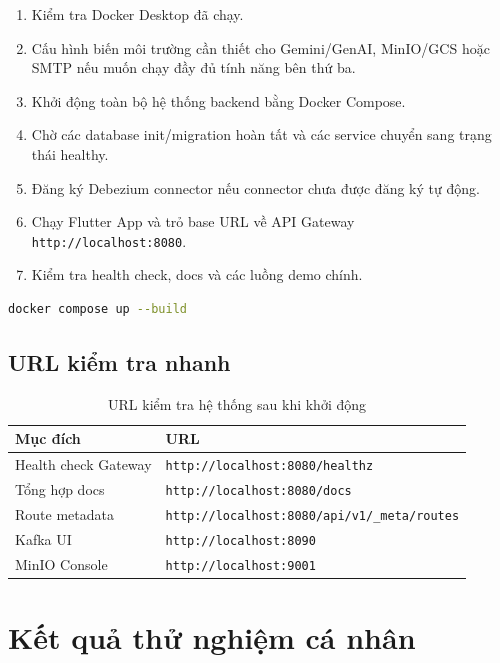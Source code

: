 \documentclass[14pt,a4paper,oneside]{extreport}
\begin{document}
\begin{enumerate}[leftmargin=2cm]
  \item Kiểm tra Docker Desktop đã chạy.
  \item Cấu hình biến môi trường cần thiết cho Gemini/GenAI, MinIO/GCS hoặc SMTP nếu muốn chạy đầy đủ tính năng bên thứ ba.
  \item Khởi động toàn bộ hệ thống backend bằng Docker Compose.
  \item Chờ các database init/migration hoàn tất và các service chuyển sang trạng thái healthy.
  \item Đăng ký Debezium connector nếu connector chưa được đăng ký tự động.
  \item Chạy Flutter App và trỏ base URL về API Gateway \texttt{http://localhost:8080}.
  \item Kiểm tra health check, docs và các luồng demo chính.
\end{enumerate}

\begin{lstlisting}[language=bash,caption={Lệnh chạy hệ thống local},label={lst:docker-compose-up}]
docker compose up --build
\end{lstlisting}

\subsection{URL kiểm tra nhanh}

\begin{table}[H]
\centering
\caption{URL kiểm tra hệ thống sau khi khởi động}
\label{tab:url-kiem-tra}
\renewcommand{\arraystretch}{1.3}
\small
\begin{tabularx}{\textwidth}{|l|X|}
\hline
\textbf{Mục đích} & \textbf{URL} \\
\hline
Health check Gateway & \texttt{http://localhost:8080/healthz} \\
\hline
Tổng hợp docs & \texttt{http://localhost:8080/docs} \\
\hline
Route metadata & \texttt{http://localhost:8080/api/v1/\_meta/routes} \\
\hline
Kafka UI & \texttt{http://localhost:8090} \\
\hline
MinIO Console & \texttt{http://localhost:9001} \\
\hline
\end{tabularx}
\end{table}

\section{Kết quả thử nghiệm cá nhân}
\label{sec:ket-qua-thu-nghiem}
\end{document}

